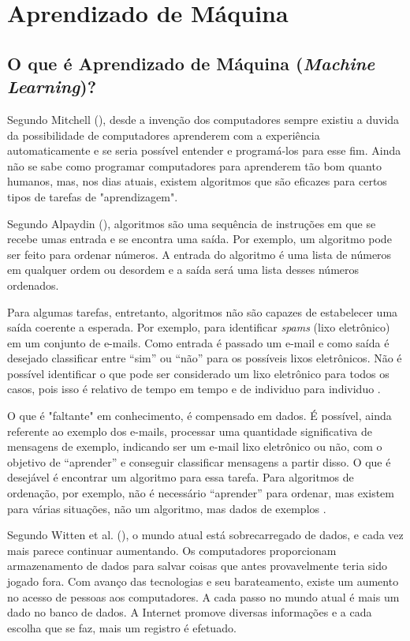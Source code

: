 \section{Aprendizado de Máquina}
\label{machineLearning}
\subsection{O que é Aprendizado de Máquina (\textit{Machine Learning})?}

Segundo Mitchell (\citeyear{Mitchell:1997:ML:541177}), desde a invenção dos computadores sempre existiu a duvida da possibilidade de computadores aprenderem com a experiência automaticamente e se seria possível entender e programá-los para esse fim. Ainda não se sabe como programar computadores para aprenderem tão bom quanto humanos, mas, nos dias atuais, existem algoritmos que são eficazes para certos tipos de tarefas de "aprendizagem". 

Segundo Alpaydin (\citeyear{Alpaydin:2010:IML:1734076}), algoritmos são uma sequência de instruções em que se recebe umas entrada e se encontra uma saída. Por exemplo, um algoritmo pode ser feito para ordenar números. A entrada do algoritmo é uma lista de números em qualquer ordem ou desordem e a saída será uma lista desses números ordenados.

Para algumas tarefas, entretanto, algoritmos não são capazes de estabelecer uma saída coerente a esperada. Por exemplo, para identificar \textit{spams} (lixo eletrônico) em um conjunto de e-mails. Como entrada é passado um e-mail e como saída é desejado classificar entre “sim” ou “não” para os possíveis lixos eletrônicos. Não é possível identificar o que pode ser considerado um lixo eletrônico para todos os casos, pois isso é relativo de tempo em tempo e de individuo para individuo \cite{Alpaydin:2010:IML:1734076}.

O que é "faltante" em conhecimento, é compensado em dados. É possível, ainda referente ao exemplo dos e-mails, processar uma quantidade significativa de mensagens de exemplo, indicando ser um e-mail lixo eletrônico ou não, com o objetivo de “aprender” e conseguir classificar mensagens a partir disso. O que é desejável é encontrar um algoritmo para essa tarefa. Para algoritmos de ordenação, por exemplo, não é necessário “aprender” para ordenar, mas existem para várias situações, não um algoritmo, mas dados de exemplos \cite{Alpaydin:2010:IML:1734076}.


Segundo Witten et al. (\citeyear{Witten:2016:DMF:3086818}), o mundo atual está sobrecarregado de dados, e cada vez mais parece continuar aumentando. Os computadores proporcionam armazenamento de dados para salvar coisas que antes provavelmente teria sido jogado fora. Com avanço das tecnologias e seu barateamento, existe um aumento no acesso de pessoas aos computadores. A cada passo no mundo atual é mais um dado no banco de dados. A Internet promove diversas informações e a cada escolha que se faz, mais um registro é efetuado.	

